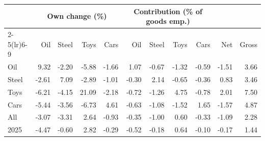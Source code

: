 \begin{tabular}{lrrrrrrrrrr}
\toprule
 & \multicolumn{4}{c}{Own change (\%)} & \multicolumn{4}{c}{Contribution (\% of goods emp.)} & & \\
\cmidrule(lr){2-5}\cmidrule(lr){6-9}
 & Oil & Steel & Toys & Cars & Oil & Steel & Toys & Cars & Net & Gross \\
\midrule
Oil & 9.32 & -2.20 & -5.88 & -1.66 & 1.07 & -0.67 & -1.32 & -0.59 & -1.51 & 3.66 \\
Steel & -2.61 & 7.09 & -2.89 & -1.01 & -0.30 & 2.14 & -0.65 & -0.36 & 0.83 & 3.46 \\
Toys & -6.21 & -4.15 & 21.09 & -2.18 & -0.72 & -1.26 & 4.75 & -0.78 & 2.01 & 7.50 \\
Cars & -5.44 & -3.56 & -6.73 & 4.61 & -0.63 & -1.08 & -1.52 & 1.65 & -1.57 & 4.87 \\
All & -3.07 & -3.31 & 2.64 & -0.93 & -0.35 & -1.00 & 0.60 & -0.33 & -1.09 & 2.28 \\
2025 & -4.47 & -0.60 & 2.82 & -0.29 & -0.52 & -0.18 & 0.64 & -0.10 & -0.17 & 1.44 \\
\bottomrule
\end{tabular}
